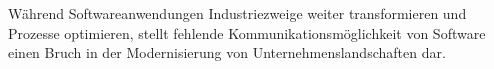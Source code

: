 \documentclass[../../expose]{subfiles}
\begin{document}
Während Softwareanwendungen Industriezweige weiter transformieren und Prozesse optimieren, stellt fehlende Kommunikationsmöglichkeit von Software einen Bruch in der Modernisierung von Unternehmenslandschaften dar.
\end{document}
